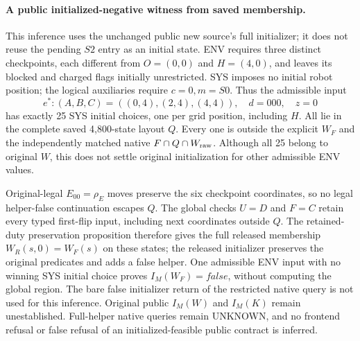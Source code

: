 \paragraph{A public initialized-negative witness from saved membership.}
This inference uses the unchanged public new source's full initializer;
it does not reuse the pending $S2$ entry as an initial state. ENV requires
three distinct checkpoints, each different from $O=(0,0)$ and $H=(4,0)$,
and leaves its blocked and charged flags initially unrestricted.
SYS imposes no initial robot position; the logical auxiliaries require
$c=0,m=S0$. Thus the admissible input
\[
 e^*: (A,B,C)=((0,4),(2,4),(4,4)),\quad d=000,\quad z=0
\]
has exactly 25 SYS initial choices, one per grid position, including $H$.
All lie in the complete saved 4,800-state layout $Q$. Every one is outside
the explicit $W_F$ and the independently matched native $F\cap Q\cap W_{\rm raw}$.
Although all 25 belong to original $W$, this does not settle original
initialization for other admissible ENV values.

Original-legal $E_{00}=\rho_E$ moves preserve the six checkpoint
coordinates, so no legal helper-false continuation escapes $Q$.
The global checks $U=D$ and $F=C$ retain every typed first-flip input,
including next coordinates outside $Q$. The retained-duty preservation proposition therefore gives
the full released membership $W_R(s,0)=W_F(s)$ on these states; the
released initializer preserves the original predicates and adds a false
helper. One admissible ENV input with no winning SYS initial choice
proves $I_M(W_F)=\mathit{false}$, without computing the global region.
The bare false initializer return of the restricted native query is not
used for this inference. Original public $I_M(W)$ and $I_M(K)$ remain
unestablished. Full-helper native queries remain UNKNOWN, and no
frontend refusal or false refusal of an initialized-feasible public
contract is inferred.

